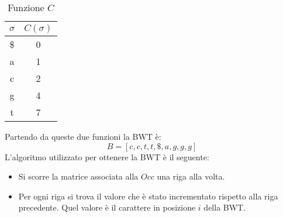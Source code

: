\begin{esempio}
    \begin{table}[!ht]
        \centering
        \begin{tabular}{|c|c|}
            \hline
            \rowcolor[HTML]{EFEFEF}
            \textbf{$\sigma$} & \textbf{$C(\sigma)$} \\ \hline
            \$                & 0                    \\ \hline
            a                 & 1                    \\ \hline
            c                 & 2                    \\ \hline
            g                 & 4                    \\ \hline
            t                 & 7                    \\ \hline
        \end{tabular}
        \caption{Funzione $C$}
    \end{table}

    Partendo da queste due funzioni la BWT è:
    \begin{equation}
        B = [c,c,t,t,\$,a,g,g,g]
    \end{equation}
    L'algoritmo utilizzato per ottenere la BWT è il seguente:
    \begin{itemize}
        \item Si scorre la matrice associata alla $Occ$ una riga alla volta.
        \item Per ogni riga si trova il valore che è stato incrementato rispetto
              alla riga precedente. Quel valore è il carattere in posizione $i$
              della BWT.
    \end{itemize}
\end{esempio}

